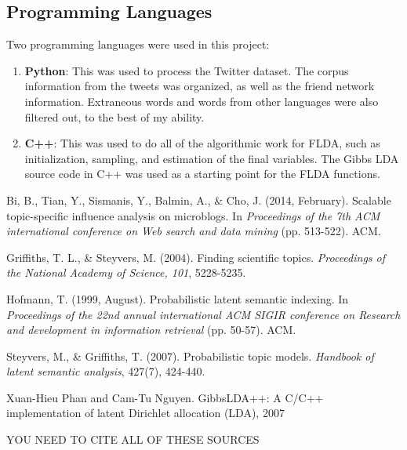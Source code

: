 \documentclass[a4paper]{article}
\begin{document}
\subsection{Programming Languages}
Two programming languages were used in this project:
\begin{enumerate}
\item \textbf{Python}: This was used to process the Twitter dataset. The corpus information from the tweets was organized, as well as the friend network information. Extraneous words and words from other languages were also filtered out, to the best of my ability.
\item \textbf{C++}: This was used to do all of the algorithmic work for FLDA, such as initialization, sampling, and estimation of the final variables. The Gibbs LDA source code in C++ was used as a starting point for the FLDA functions.
\end{enumerate}


\begin{thebibliography}{9}
Bi, B., Tian, Y., Sismanis, Y., Balmin, A., \& Cho, J. (2014, February). Scalable topic-specific influence analysis on microblogs. In \textit{Proceedings of the 7th ACM international conference on Web search and data mining} (pp. 513-522). ACM.

Griffiths, T. L., \& Steyvers, M. (2004). Finding scientific topics. \textit{Proceedings of the National Academy of Science, 101}, 5228-5235.

Hofmann, T. (1999, August). Probabilistic latent semantic indexing. In \textit{Proceedings of the 22nd annual international ACM SIGIR conference on Research and development in information retrieval} (pp. 50-57). ACM.

Steyvers, M., \& Griffiths, T. (2007). Probabilistic topic models. \textit{Handbook of latent semantic analysis}, 427(7), 424-440.

Xuan-Hieu Phan and Cam-Tu Nguyen. GibbsLDA++: A C/C++ implementation of latent Dirichlet allocation (LDA), 2007

YOU NEED TO CITE ALL OF THESE SOURCES

\end{thebibliography}
\end{document}
